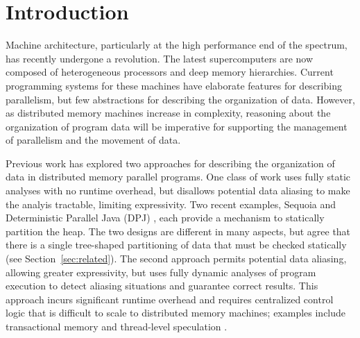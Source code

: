 

\section{Introduction}
\label{sec:intro}

Machine architecture, particularly at the high
performance end of the spectrum, has recently undergone a revolution.  The
latest supercomputers are now composed of heterogeneous processors
and deep memory hierarchies.  Current programming systems for these
machines have elaborate features for describing parallelism, but 
few abstractions for describing the organization of data.  However, as 
distributed memory machines increase in complexity,
reasoning about the organization of program data will be imperative
for supporting the management of parallelism and the movement of data.



Previous work has explored two approaches for describing the organization of data
in distributed memory parallel programs.
One class of work uses fully static analyses with no runtime overhead, but 
disallows potential data aliasing to make the analyis tractable, limiting expressivity.
Two recent examples, Sequoia \cite{Fatahalian06} and 
Deterministic Parallel Java (DPJ) \cite{Bocchino09}, each provide a 
mechanism to statically partition the heap.
The two designs are different in many aspects, but agree that there is
a single tree-shaped partitioning of data that must be checked statically 
(see Section~\ref{sec:related}).  The second approach permits potential data
aliasing, allowing greater expressivity, but uses fully dynamic analyses of
program execution to detect aliasing situations and guarantee correct results.
This approach incurs significant runtime overhead and requires 
centralized control logic that is difficult to scale to distributed 
memory machines; examples include transactional memory \cite{Harris05} 
and thread-level speculation \cite{Steffan00}.

